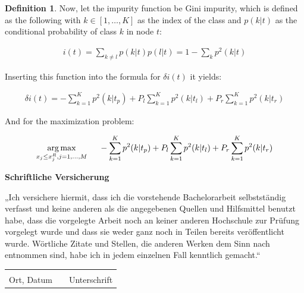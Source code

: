 \documentclass[12pt, a4paper]{scrartcl}
\theoremstyle{definition}
\newtheorem{definition}{Definition}[subsection]
\begin{document}
\begin{definition}
Now, let the impurity function be Gini impurity, which is defined as the
following with $k\in[1,\dots,K]$ as the index of the class and $p(k|t)$ as the
conditional probability of class $k$ in node $t$:

\begin{align*}
i(t) = \sum_{k\neq l} p(k|t) p(l|t) = 1-\sum_kp^2(k|t)
\end{align*}

Inserting this function into the formula for $\delta i(t)$ it yields:

\begin{align*}
\delta i(t) = -\sum^K_{k=1}p^2(k|t_p) + P_l\sum^K_{k=1}p^2(k|t_l) + P_r\sum^K_{k=1}p^2(k|t_r)
\end{align*}

And for the maximization problem:

\begin{align*}
\underset{x_j\leq x^R_j,j=1,\dots,M}{\arg\max}\hspace{5mm} -\sum^K_{k=1}p^2(k|t_p) + P_l\sum^K_{k=1}p^2(k|t_l) + P_r\sum^K_{k=1}p^2(k|t_r)
\end{align*}
\label{def:giniimpurity}
\end{definition}

\newpage



\newpage

\vspace*{5cm}

\textbf{\Large Schriftliche Versicherung}\vspace{3cm}

„Ich versichere hiermit, dass ich die vorstehende Bachelorarbeit selbstständig
verfasst und keine anderen als die angegebenen Quellen und Hilfsmittel benutzt
habe, dass die vorgelegte Arbeit noch an keiner anderen Hochschule zur Prüfung
vorgelegt wurde und dass sie weder ganz noch in Teilen bereits veröffentlicht
wurde. Wörtliche Zitate und Stellen, die anderen Werken dem Sinn nach entnommen
sind, habe ich in jedem einzelnen Fall kenntlich gemacht.“

\vspace{3cm}

\begin{tabular}{p{4cm}p{4cm}p{4cm}} \\
&  & \\ \cline{1-1} \cline{3-3}
\footnotesize{Ort, Datum} & & \footnotesize{Unterschrift}\\
\end{tabular}
\end{document}
